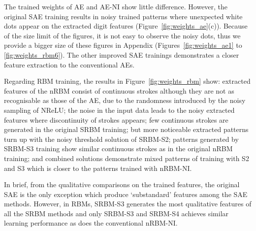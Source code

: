 The trained weights of AE and AE-NI show little difference.
However, the original SAE training results in noisy trained patterns where unexpected white dots appear on the extracted digit features (Figure~\ref{fig:weights_ae}(c)).
Because of the size limit of the figures, it is not easy to observe the noisy dots, thus we provide a bigger size of these figures in Appendix (Figures~\ref{fig:weights_ae1} to \ref{fig:weights_rbm6}).
The other improved SAE trainings demonstrates a closer feature extraction to the conventional AEs.



Regarding RBM training,
the results in Figure~\ref{fig:weights_rbm} show:
extracted features of the nRBM consist of continuous strokes although they are not as recognisable as those of the AE, due to the randomness introduced by the noisy sampling of NReLU;
the noise in the input data leads to the noisy extracted features where discontinuity of strokes appears;
few continuous strokes are generated in the original SRBM training;
but more noticeable extracted patterns turn up with the noisy threshold solution of SRBM-S2;
patterns generated by SRBM-S3 training show similar continuous strokes as in the original nRBM training;
and combined solutions demonstrate mixed patterns of training with S2 and S3 which is closer to the patterns trained with nRBM-NI. 

In brief, from the qualitative comparisons on the trained features, the original SAE is the only exception which produce `substandard' features among the SAE methods.
However, in RBMs, SRBM-S3 generates the most qualitative features of all the SRBM methods and only SRBM-S3 and SRBM-S4 achieves similar learning performance as does the conventional nRBM-NI.
\DIFdelbegin %

